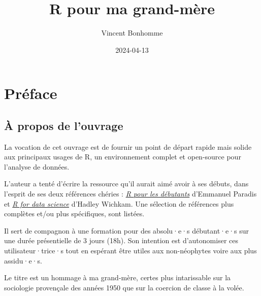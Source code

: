 \documentclass[
  letterpaper,
  DIV=11,
  numbers=noendperiod]{scrreprt}
\title{R pour ma grand-mère}
\author{Vincent Bonhomme}
\date{2024-04-13}
\renewcommand*\contentsname{Table of contents}
\newcommand\contentsname{Table of contents}
\begin{document}
\maketitle
\ifdefined\Shaded\renewenvironment{Shaded}{\begin{tcolorbox}[sharp corners, enhanced, frame hidden, borderline west={3pt}{0pt}{shadecolor}, breakable, interior hidden, boxrule=0pt]}{\end{tcolorbox}}\fi

\renewcommand*\contentsname{Table of contents}
{
\hypersetup{linkcolor=}
\setcounter{tocdepth}{2}
\tableofcontents
}

\hypertarget{pruxe9face}{%
\chapter*{Préface}\label{pruxe9face}}


\hypertarget{uxe0-propos-de-louvrage}{%
\section*{À propos de l'ouvrage}\label{uxe0-propos-de-louvrage}}


La vocation de cet ouvrage est de fournir un point de départ rapide mais
solide aux principaux usages de R, un environnement complet et
open-source pour l'analyse de données.

L'auteur a tenté d'écrire la ressource qu'il aurait aimé avoir à ses
débuts, dans l'esprit de ses deux références chéries :
\href{https://cran.r-project.org/doc/contrib/Paradis-rdebuts_fr}{\emph{R
pour les débutants}} d'Emmanuel Paradis et
\href{https://r4ds.hadley.nz/}{\emph{R for data science}} d'Hadley
Wichkam. Une sélection de références plus complètes et/ou plus
spécifiques, sont listées.

Il sert de compagnon à une formation pour des absolu·e·s débutant·e·s
sur une durée présentielle de 3 jours (18h). Son intention est
d'autonomiser ces utilisateur·trice·s tout en espérant être utiles aux
non-néophytes voire aux plus assidu·e·s.

Le titre est un hommage à ma grand-mère, certes plus intarissable sur la
sociologie provençale des années 1950 que sur la coercion de classe à la
volée.
\end{document}
